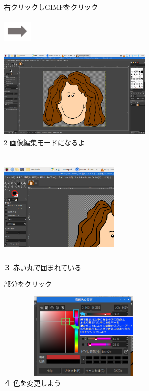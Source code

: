 \documentclass[a4paper,12pt]{jarticle}
\begin{document}
\begin{figure}[ht]
\begin{minipage}{\textwidth}
\begin{minipage}{5.852cm}
      右クリックしGIMPをクリック
    \end{minipage}
    \includegraphics[width=1.489cm,height=1.365cm]{textbook-img128.png}
    \begin{minipage}{7.975cm}
      \includegraphics[width=7.65cm,height=4.426cm]{textbook-img125.png}\\
      2 画像編集モードになるよ
    \end{minipage}


  \end{minipage}
  \bigskip




  \begin{minipage}{\textwidth}
    \begin{minipage}{5.984cm}
      \includegraphics[width=5.971cm,height=5.738cm]{textbook-img129.png}\\
      ３ 赤い丸で囲まれている

      部分をクリック


      \bigskip
    \end{minipage}
    \hfill
    \begin{minipage}{8.984cm}
      \includegraphics[width=8.654cm,height=4.325cm]{textbook-img126.png}\\
      ４ 色を変更しよう


\end{minipage}
\end{minipage}
\end{figure}
\end{document}
